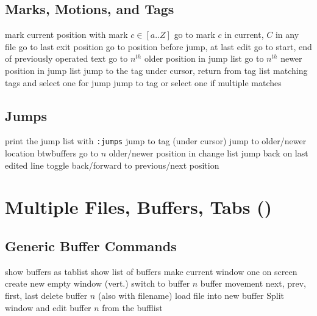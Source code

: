 \subsection{Marks, Motions, and Tags}	{}
	{mark current position with mark $c\in[a..Z]$}
	{go to mark $c$ in current, $C$ in any file}
	{go to last exit position}
	{go to position before jump, at last edit}
	{go to start, end of previously operated text}
	{go to $n^{th}$ older position in jump list}
	{go to $n^{th}$ newer position in jump list}
\cmdS{\ctrl ] \ctrl T }	{jump to the tag under cursor, return from tag}
	{list matching tags and select one for jump}
	{jump to tag or select one if multiple matches}

\subsection{Jumps}	{print the jump list with {\tt :jumps}}
\cmdS{:ta \ctrl[ }	{jump to tag (under cursor)}
	{jump to older/newer location btw\. buffers}
	{go to $n$ older/newer position in change list}
	{jump back on last edited line}
	{toggle back/forward to previous/next position}

\section{Multiple Files, Buffers, Tabs (\enter)}	{}
\subsection{Generic Buffer Commands}	{}
	{show buffers as tablist}
	{show list of buffers}
	{make current window one on screen}
	{create new empty window (vert.)}
	{switch to buffer $n$}
	{buffer movement next, prev, first, last}
	{delete buffer $n$ (also with filename)}
	{load file into new buffer}
	{Split window and edit buffer $n$ from the bufflist}

